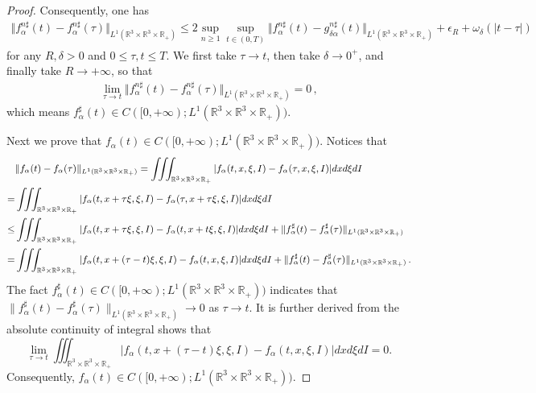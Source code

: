 \documentclass[reqno,11pt]{amsart}
\numberwithin{equation}{section}
\def\R{\mathbb{R}}
\begin{document}
\begin{proof}
Consequently, one has
\begin{equation*}
  \begin{aligned}
    \Vert f^{n\sharp }_\alpha (t)- f^{n\sharp }_\alpha (\tau) \Vert_{L^1(\R^3 \times \R^3 \times \R_+)} \leq 2 \sup_{n \geq 1} \sup \limits_{t\in (0,T)} \Vert f^{n\sharp }_\alpha (t)- g^{n\sharp }_{\delta \alpha } (t) \Vert_{L^1(\R^3 \times \R^3 \times \R_+)} + \epsilon_R + \omega_\delta(|t-\tau|) 
  \end{aligned}
\end{equation*}
for any $R, \delta > 0$ and $0 \leq \tau, t \leq T$. We first take $\tau \to t$, then take $\delta \to 0^+$, and finally take $R \to + \infty$, so that
\begin{equation*}
  \begin{aligned}
    \lim_{\tau \to t} \Vert f^{n\sharp }_\alpha (t)- f^{n\sharp }_\alpha (\tau) \Vert_{L^1(\R^3 \times \R^3 \times \R_+)} = 0 \,,
  \end{aligned}
\end{equation*}
which means $f^{\sharp }_\alpha (t) \in C([0,+\infty); L^1(\R^3 \times \R^3 \times \R_+))$. 

Next we prove that $f_\alpha (t) \in C([0,+\infty); L^1(\R^3 \times \R^3 \times \R_+))$. Notices that
\begin{equation*}{\small
  \begin{aligned}
    & \Vert f_\alpha (t)- f_\alpha (\tau) \Vert_{L^1(\R^3 \times \R^3 \times \R_+)} = \iiint_{ \R^3 \times \R^3 \times \R_+ } | f_\alpha (t, x, \xi, I) - f_\alpha ( \tau, x, \xi, I ) | d x d \xi d I \\
    = & \iiint_{ \R^3 \times \R^3 \times \R_+ } | f_\alpha (t, x + \tau \xi, \xi, I) - f_\alpha ( \tau, x + \tau \xi, \xi, I ) | d x d \xi d I \\
    \leq & \iiint_{ \R^3 \times \R^3 \times \R_+ } | f_\alpha (t, x + \tau \xi, \xi, I) - f_\alpha ( t, x + t \xi, \xi, I ) | d x d \xi d I + \| f_\alpha^\sharp (t) - f_\alpha^\sharp ( \tau ) \|_{L^1(\R^3 \times \R^3 \times \R_+)} \\
    = & \iiint_{ \R^3 \times \R^3 \times \R_+ } | f_\alpha (t, x + ( \tau - t ) \xi, \xi, I) - f_\alpha ( t, x, \xi, I ) | d x d \xi d I + \| f_\alpha^\sharp (t) - f_\alpha^\sharp ( \tau ) \|_{L^1(\R^3 \times \R^3 \times \R_+)} \,.
  \end{aligned}}
\end{equation*}
The fact $f^{\sharp }_\alpha (t) \in C([0,+\infty); L^1(\R^3 \times \R^3 \times \R_+))$ indicates that $\| f_\alpha^\sharp (t) - f_\alpha^\sharp ( \tau ) \|_{L^1(\R^3 \times \R^3 \times \R_+)} \to 0$ as $\tau \to t$. It is further derived from the absolute continuity of integral shows that
	\begin{equation*}
		\lim\limits_{\tau \rightarrow t} \iiint_{ \R^3 \times \R^3 \times \R_+ } | f_\alpha (t, x + ( \tau - t ) \xi, \xi, I) - f_\alpha ( t, x, \xi, I ) | d x d \xi d I = 0.
	\end{equation*}
Consequently, $f_\alpha (t) \in C([0,+\infty); L^1(\R^3 \times \R^3 \times \R_+))$.


\end{proof}
\end{document}
